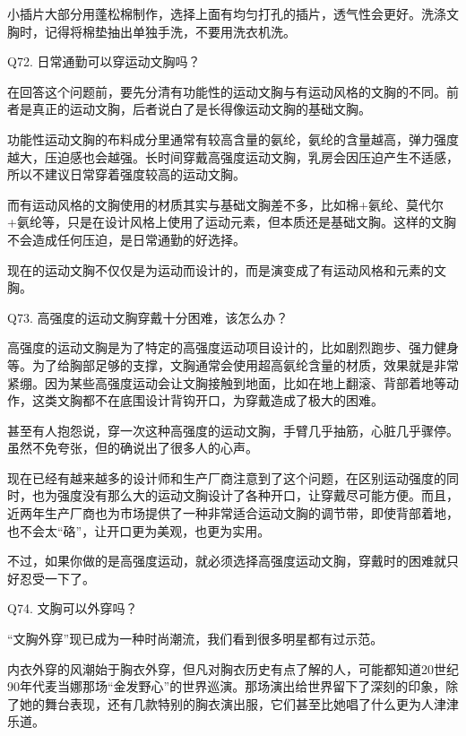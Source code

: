 \documentclass[12pt,UTF8]{ctexbook}
\begin{document}
小插片大部分用蓬松棉制作，选择上面有均匀打孔的插片，透气性会更好。洗涤文胸时，记得将棉垫抽出单独手洗，不要用洗衣机洗。





Q72. 日常通勤可以穿运动文胸吗？


在回答这个问题前，要先分清有功能性的运动文胸与有运动风格的文胸的不同。前者是真正的运动文胸，后者说白了是长得像运动文胸的基础文胸。

功能性运动文胸的布料成分里通常有较高含量的氨纶，氨纶的含量越高，弹力强度越大，压迫感也会越强。长时间穿戴高强度运动文胸，乳房会因压迫产生不适感，所以不建议日常穿着强度较高的运动文胸。

而有运动风格的文胸使用的材质其实与基础文胸差不多，比如棉+氨纶、莫代尔+氨纶等，只是在设计风格上使用了运动元素，但本质还是基础文胸。这样的文胸不会造成任何压迫，是日常通勤的好选择。

现在的运动文胸不仅仅是为运动而设计的，而是演变成了有运动风格和元素的文胸。





Q73. 高强度的运动文胸穿戴十分困难，该怎么办？


高强度的运动文胸是为了特定的高强度运动项目设计的，比如剧烈跑步、强力健身等。为了给胸部足够的支撑，文胸通常会使用超高氨纶含量的材质，效果就是非常紧绷。因为某些高强度运动会让文胸接触到地面，比如在地上翻滚、背部着地等动作，这类文胸都不在底围设计背钩开口，为穿戴造成了极大的困难。

甚至有人抱怨说，穿一次这种高强度的运动文胸，手臂几乎抽筋，心脏几乎骤停。虽然不免夸张，但的确说出了很多人的心声。

现在已经有越来越多的设计师和生产厂商注意到了这个问题，在区别运动强度的同时，也为强度没有那么大的运动文胸设计了各种开口，让穿戴尽可能方便。而且，近两年生产厂商也为市场提供了一种非常适合运动文胸的调节带，即使背部着地，也不会太“硌”，让开口更为美观，也更为实用。

不过，如果你做的是高强度运动，就必须选择高强度运动文胸，穿戴时的困难就只好忍受一下了。





Q74. 文胸可以外穿吗？


“文胸外穿”现已成为一种时尚潮流，我们看到很多明星都有过示范。

内衣外穿的风潮始于胸衣外穿，但凡对胸衣历史有点了解的人，可能都知道20世纪90年代麦当娜那场“金发野心”的世界巡演。那场演出给世界留下了深刻的印象，除了她的舞台表现，还有几款特别的胸衣演出服，它们甚至比她唱了什么更为人津津乐道。
\end{document}
